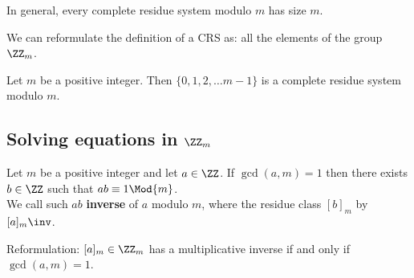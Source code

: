 \documentclass[12pt, a4paper]{article}
\begin{document}
\begin{mdremark}
    In general, every complete residue system modulo \(m\) has size \(m\).
\end{mdremark}

\begin{mdnote}
    We can reformulate the definition of a CRS as: all the elements of the group \(\ZZ_m\).
\end{mdnote}

\begin{example}
    Let \(m\) be a positive integer. Then \(\{0,1,2,\ldots m-1\}\) is a complete residue system modulo \(m\).
\end{example}

\subsection{Solving equations in \texorpdfstring{\(\ZZ_m\)}{TEXT}}



\begin{mdlemma}
    Let \(m\) be a positive integer and let \(a\in \ZZ\). If \(\gcd(a,m)=1\) then there exists \(b\in \ZZ\) such that \(ab \equiv 1 \Mod{m}\). \\
    We call such \(ab\) \textbf{inverse} of \(a\) modulo \(m\), where the residue class \([b]_m\) by \([a]_m\inv\).
\end{mdlemma}

\begin{mdremark}
    Reformulation: \([a]_m \in \ZZ_m\) has a multiplicative inverse if and only if \\ \(\gcd(a,m)=1\).
\end{mdremark}
\end{document}
